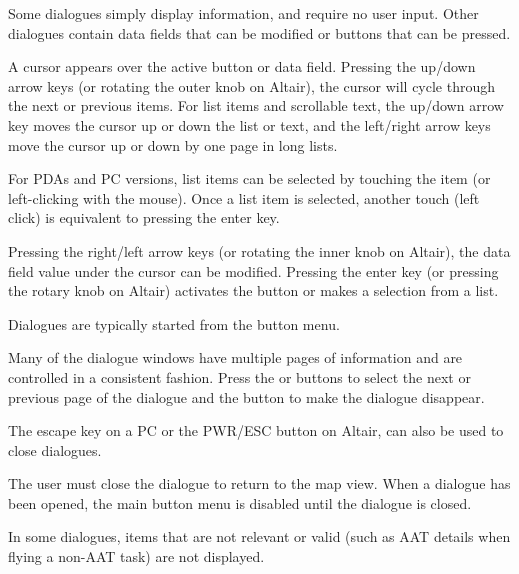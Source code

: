 Some dialogues simply display information, and require no user input. Other
dialogues contain data fields that can be modified or buttons that can be pressed.

A cursor appears over the active button or data field. Pressing the up/down
arrow keys (or rotating the outer knob on Altair), the cursor will cycle
through the next or previous items. For list items and scrollable text, the
up/down arrow key moves the cursor up or down the list or text, and the
left/right arrow keys move the cursor up or down by one page in long lists.

For PDAs and PC versions, list items can be selected by touching the item (or
left-clicking with the mouse). Once a list item is selected, another touch
(left click) is equivalent to pressing the enter key.

Pressing the right/left arrow keys (or rotating the inner knob on Altair), the
data field value under the cursor can be modified. Pressing the enter key (or
pressing the rotary knob on Altair) activates the button or makes a selection
from a list.

Dialogues are typically started from the button menu.

Many of the dialogue windows have multiple pages of information and are controlled
in a consistent fashion. Press the \button{$<$} or \button{$>$} buttons to
select the next or previous page of the dialogue and the  button to
make the dialogue disappear.

The escape key on a PC or the PWR/ESC button on Altair, can also be used to
close dialogues.

The user must close the dialogue to return to the map view. When a dialogue
has been opened, the main button menu is disabled until the dialogue is closed.

In some dialogues, items that are not relevant or valid (such as AAT details when
flying a non-AAT task) are not displayed.


